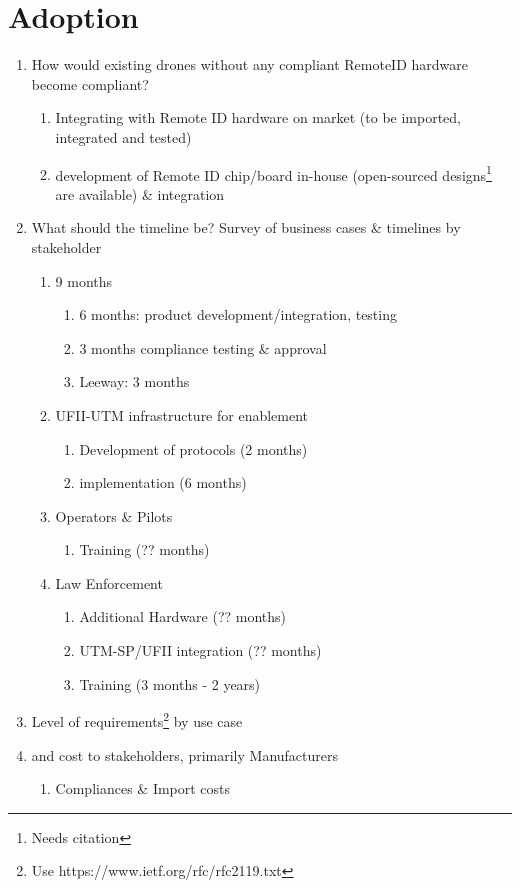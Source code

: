 \documentclass{ua_wgs_base}
\begin{document}
\section{Adoption}
\begin{enumerate}
\item How would existing drones without any compliant RemoteID hardware
become compliant?
\begin{enumerate}
\item Integrating with Remote ID hardware on market (to be imported, integrated
and tested)
\item development of Remote ID chip/board in-house (open-sourced designs\footnote{Needs citation}
are available) \& integration
\end{enumerate}
\item What should the timeline be? Survey of business cases \& timelines
by stakeholder
\begin{enumerate}
\item 9 months
\begin{enumerate}
\item 6 months: product development/integration, testing
\item 3 months compliance testing \& approval
\item Leeway: 3 months
\end{enumerate}
\item UFII-UTM infrastructure for enablement
\begin{enumerate}
\item Development of protocols (2 months)
\item implementation (6 months)
\end{enumerate}
\item Operators \& Pilots
\begin{enumerate}
\item Training (?? months)
\end{enumerate}
\item Law Enforcement
\begin{enumerate}
\item Additional Hardware (?? months)
\item UTM-SP/UFII integration (?? months)
\item Training (3 months - 2 years)
\end{enumerate}
\end{enumerate}
\item Level of requirements\footnote{Use https://www.ietf.org/rfc/rfc2119.txt}
by use case
\item and cost to stakeholders, primarily Manufacturers
\begin{enumerate}
\item Compliances \& Import costs
\end{enumerate}
\end{enumerate}
\end{document}
